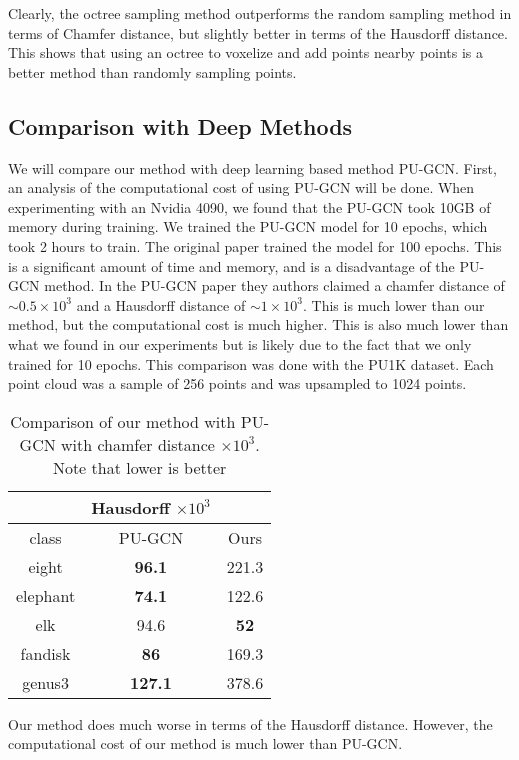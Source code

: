 Clearly, the octree sampling method outperforms the random sampling method in terms of Chamfer distance, but slightly better in terms of the Hausdorff distance.
This shows that using an octree to voxelize and add points nearby points is a better method than randomly sampling points.

\subsection{Comparison with Deep Methods}

We will compare our method with deep learning based method PU-GCN\cite{PU-GCN}.
First, an analysis of the computational cost of using PU-GCN will be done. 
When experimenting with an Nvidia 4090, we found that the PU-GCN took 10GB of memory during training.
We trained the PU-GCN model for 10 epochs, which took 2 hours to train.
The original paper trained the model for 100 epochs. 
This is a significant amount of time and memory, and is a disadvantage of the PU-GCN method.
In the PU-GCN paper they authors claimed a chamfer distance of $\sim 0.5 \times 10^3$ and a Hausdorff distance of $\sim 1 \times 10^3$.
This is much lower than our method, but the computational cost is much higher.
This is also much lower than what we found in our experiments but is likely due to the fact that we only trained for 10 epochs.
This comparison was done with the PU1K dataset. Each point cloud was a sample of 256 points and was upsampled to 1024 points. 

\begin{table}[H]
\centering
\begin{tabular}{ccc}
	& Hausdorff $\times 10^3$ &\\
	\hline
	class & PU-GCN & Ours \\
	\hline
	eight & \textbf{96.1} & {221.3} \\ 
	elephant &  \textbf{74.1}& {122.6} \\
	elk & {94.6} & \textbf{52} \\  
	fandisk & \textbf{86} & {169.3} \\  
	genus3 & \textbf{127.1} & {378.6}  \\
\end{tabular}
\caption{Comparison of our method with PU-GCN with chamfer distance $\times 10^3$. Note that lower is better}
\end{table}

Our method does much worse in terms of the Hausdorff distance.
However, the computational cost of our method is much lower than PU-GCN.


